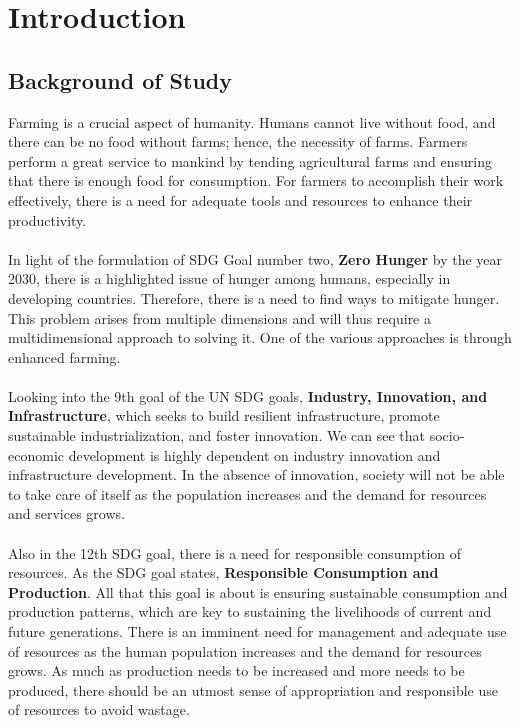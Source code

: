 \documentclass[12pt, a4paper]{article}
\begin{document}
\newpage

\tableofcontents
\newpage
\listoffigures
\newpage
{}
\section{Introduction}
\subsection{Background of Study}
Farming is a crucial aspect of humanity. Humans cannot live without food, and there can be no food without farms; hence, the necessity of farms. Farmers perform a great service to mankind by tending agricultural farms and ensuring that there is enough food for consumption. For farmers to accomplish their work effectively, there is a need for adequate tools and resources to enhance their productivity.\\
\\
In light of the formulation of SDG Goal number two, \textbf{Zero Hunger} by the year 2030\cite{unhunger}, there is a highlighted issue of hunger among humans, especially in developing countries. Therefore, there is a need to find ways to mitigate hunger. This problem arises from multiple dimensions and will thus require a multidimensional approach to solving it. One of the various approaches is through enhanced farming.\\
\\
Looking into the 9th goal of the UN SDG goals, \textbf{Industry, Innovation, and Infrastructure}, which seeks to build resilient infrastructure, promote sustainable industrialization, and foster innovation\cite{uninnovation}. We can see that socio-economic development is highly dependent on industry innovation and infrastructure development. In the absence of innovation, society will not be able to take care of itself as the population increases and the demand for resources and services grows.\\
\\
Also in the 12th SDG goal, there is a need for responsible consumption of resources. As the SDG goal states, \textbf{Responsible Consumption and Production}. All that this goal is about is ensuring sustainable consumption and production patterns, which are key to sustaining the livelihoods of current and future generations\cite{unresponsible}. There is an imminent need for management and adequate use of resources as the human population increases and the demand for resources grows. As much as production needs to be increased and more needs to be produced, there should be an utmost sense of appropriation and responsible use of resources to avoid wastage.\\
\end{document}
